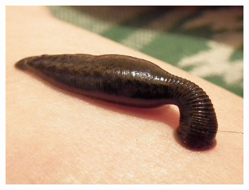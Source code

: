 \documentclass{beamer}
\begin{document}
\begin{frame}
\begin{figure}
\begin{subfigure}{0.32\linewidth}
            \end{subfigure}
            \begin{subfigure}{0.27\linewidth}
                \includegraphics[width=\textwidth]{Leech.jpg}
            \end{subfigure}
        \end{figure}
    
    \end{frame}
\end{document}
